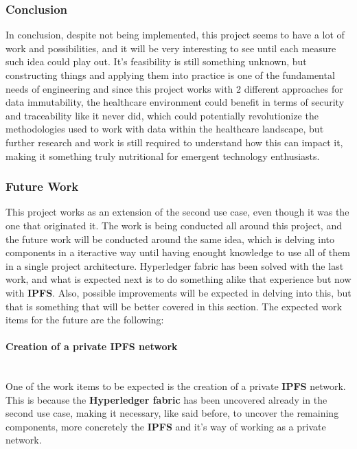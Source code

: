 \subsubsection{Conclusion} 
In conclusion, despite not being implemented, this project seems to have a lot of work and possibilities, and it will be very interesting 
to see until each measure such idea could play out. It's feasibility is still something unknown, but constructing things and applying 
them into practice is one of the fundamental needs of engineering and since this project works with 2 different approaches for data 
immutability, the healthcare environment could benefit in terms of security and traceability like it never did, which could potentially 
revolutionize the methodologies used to work with data within the healthcare landscape, but further research and work is still required 
to understand how this can impact it, making it something truly nutritional for emergent technology enthusiasts.

\subsubsection{Future Work}
This project works as an extension of the second use case, even though it was the one that originated it. The work is being conducted all
around this project, and the future work will be conducted around the same idea, which is delving into components in a iteractive way  
until having enought knowledge to use all of them in a single project architecture. Hyperledger fabric has been solved with the last work, 
and what is expected next is to do something alike that experience but now with \textbf{IPFS}. Also, possible improvements will be expected 
in delving into this, but that is something that will be better covered in this section. The expected work items for the future are 
the following:

\paragraph{Creation of a private IPFS network} \mbox{} \\
One of the work items to be expected is the creation of a private \textbf{IPFS} network. This is because the \textbf{Hyperledger fabric} 
has been uncovered already in the second use case, making it necessary, like said before, to uncover the remaining components, more 
concretely the \textbf{IPFS} and it's way of working as a private network.

